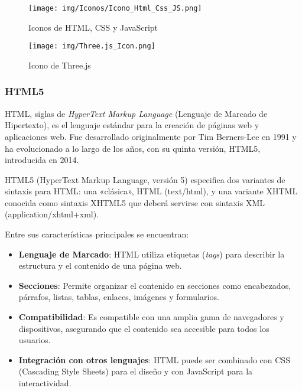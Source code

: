 \documentclass[a4paper, 12pt]{book}
\begin{document}
            \begin{figure}[H]
            \centering
            \begin{minipage}{0.45\textwidth}
            \centering
            \texttt{[image: img/Iconos/Icono\_Html\_Css\_JS.png]}
            \caption{Iconos de HTML, CSS y JavaScript}
            \label{fig:enter-label}
            \end{minipage}
            \begin{minipage}{0.45\textwidth}
                \centering
                \texttt{[image: img/Three.js\_Icon.png]}
                \caption{Icono de Three.js}
                \label{fig:Three.js_Icon}
            \end{minipage}\hfill
        \end{figure}
        \subsubsection{HTML5}        
        HTML, siglas de \textit{HyperText Markup Language} (Lenguaje de Marcado de Hipertexto), es el lenguaje estándar para la creación de páginas web y aplicaciones web. Fue desarrollado originalmente por Tim Berners-Lee en 1991 y ha evolucionado a lo largo de los años, con su quinta versión, HTML5, introducida en 2014.

        HTML5\cite{HTML5,franganillo2010html5} (HyperText Markup Language, versión 5) especifica dos variantes de sintaxis para HTML: una «clásica», HTML (text/html), y una variante XHTML conocida como sintaxis XHTML5 que deberá servirse con sintaxis XML (application/xhtml+xml).\cite{HTML5}


        Entre sus características principales se encuentran:
        \begin{itemize}
            \item \textbf{Lenguaje de Marcado}: HTML utiliza etiquetas (\textit{tags}) para describir la estructura y el contenido de una página web.
            \item \textbf{Secciones}: Permite organizar el contenido en secciones como encabezados, párrafos, listas, tablas, enlaces, imágenes y formularios.
            \item \textbf{Compatibilidad}: Es compatible con una amplia gama de navegadores y dispositivos, asegurando que el contenido sea accesible para todos los usuarios.
            \item \textbf{Integración con otros lenguajes}: HTML puede ser combinado con CSS (Cascading Style Sheets) para el diseño y con JavaScript para la interactividad.
        \end{itemize}
\end{document}
